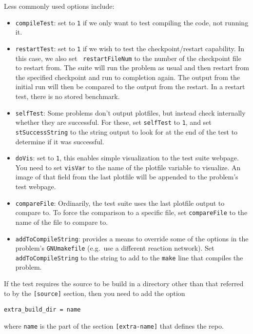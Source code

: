 Less commonly used options include:
\begin{itemize}
\item {\tt compileTest}: set to {\tt 1} if we only want to test compiling
  the code, not running it.

\item {\tt restartTest}: set to {\tt 1} if we wish to test the
  checkpoint/restart capability.  In this case, we also set {\tt
    restartFileNum} to the number of the checkpoint file to restart
  from.  The suite will run the problem as usual and then restart from
  the specified checkpoint and run to completion again.  The output
  from the initial run will then be compared to the output from the
  restart.  In a restart test, there is no stored benchmark.

\item {\tt selfTest}: Some problems don't output plotfiles, but
  instead check internally whether they are successful.  For these,
  set {\tt selfTest} to {\tt 1}, and set {\tt stSuccessString} to the
  string output to look for at the end of the test to determine if it
  was successful.

\item {\tt doVis}: set to {\tt 1}, this enables simple visualization
  to the test suite webpage.  You need to set {\tt visVar} to the name
  of the plotfile variable to visualize.  An image of that field from
  the last plotfile will be appended to the problem's test webpage.

\item {\tt compareFile}: Ordinarily, the test suite uses the last
  plotfile output to compare to.  To force the comparison to a
  specific file, set {\tt compareFile} to the name of the file to
  compare to.

\item {\tt addToCompileString}: provides a means to override some of
  the options in the problem's {\tt GNUmakefile} (e.g.\ use a
  different reaction network).  Set {\tt addToCompileString} to the
  string to add to the {\tt make} line that compiles the problem.
\end{itemize}

If the test requires the source to be build in a directory other 
than that referred to by the {\tt [source]} section, then you
need to add the option
\begin{lstlisting}
extra_build_dir = name
\end{lstlisting}
where {\tt name} is the part of the section {\tt [extra-name]} 
that defines the repo.

